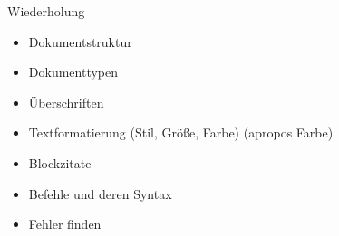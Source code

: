 \begin{frame}{Wiederholung}
\begin{itemize}[<+->]
    \item Dokumentstruktur
    \item Dokumenttypen
    \item Überschriften
    \item Textformatierung (Stil, Größe, Farbe) (apropos Farbe)
    \item Blockzitate
    \item Befehle und deren Syntax
    \item Fehler finden
\end{itemize}
\end{frame}